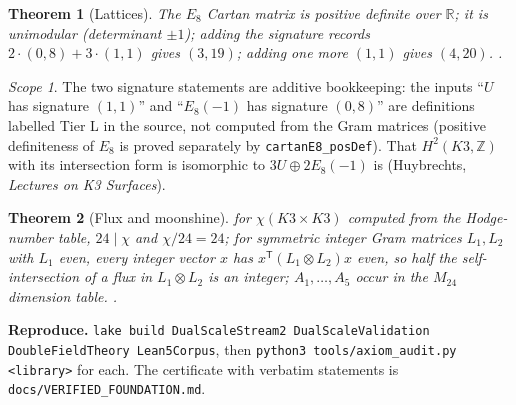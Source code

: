 \documentclass[11pt,a4paper]{report}
\newtheorem{theorem}{Theorem}[chapter]
\theoremstyle{remark}
\newtheorem*{scope}{Scope}
\begin{document}
\begin{theorem}[Lattices]
\leanok
The $E_8$ Cartan matrix is positive definite over $\mathbb{R}$;
\leanok
it is unimodular (determinant $\pm1$);
\leanok
adding the signature records $2\cdot(0,8)+3\cdot(1,1)$ gives $(3,19)$;
\leanok
adding one more $(1,1)$ gives $(4,20)$. \TA{}.
\end{theorem}
\begin{scope}
The two signature statements are additive bookkeeping: the inputs ``$U$ has signature $(1,1)$'' and
``$E_8(-1)$ has signature $(0,8)$'' are definitions labelled Tier L in the source, not computed from the Gram
matrices (positive definiteness of $E_8$ is proved separately by \texttt{cartanE8\_posDef}). That
$H^2(K3,\mathbb{Z})$ with its intersection form is isomorphic to $3U\oplus2E_8(-1)$ is \TL{} (Huybrechts,
\emph{Lectures on K3 Surfaces}).
\end{scope}

\begin{theorem}[Flux and moonshine]
\leanok
for $\chi(K3\times K3)$ computed from the Hodge-number table, $24\mid\chi$ and $\chi/24=24$;
\leanok
for symmetric integer Gram matrices $L_1,L_2$ with $L_1$ even, every integer vector $x$ has
$x^{\mathsf T}(L_1\otimes L_2)x$ even, so half the self-intersection of a flux in $L_1\otimes L_2$ is an integer;
\leanok
$A_1,\dots,A_5$ occur in the $M_{24}$ dimension table. \TA{}.
\end{theorem}

\bigskip\noindent\textbf{Reproduce.}
\texttt{lake build DualScaleStream2 DualScaleValidation DoubleFieldTheory Lean5Corpus}, then
\texttt{python3 tools/axiom\_audit.py <library>} for each. The certificate with verbatim statements is
\texttt{docs/VERIFIED\_FOUNDATION.md}.
\end{document}
